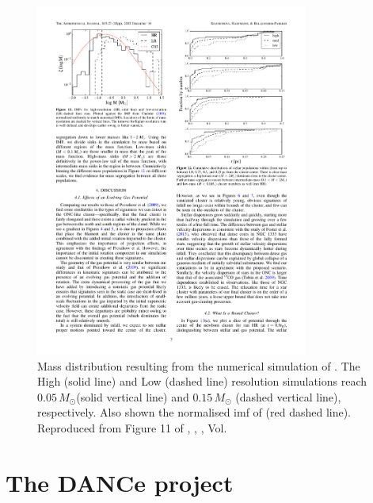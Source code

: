\begin{figure}[ht!]
\begin{center}
\includegraphics[width=0.8\textwidth]{background/Figures/F11_Kuznetsova2015.pdf}
\caption{Mass distribution resulting from the numerical simulation of \citet{2015ApJ...815...27K}. The High (solid line) and Low (dashed line) resolution simulations reach $0.05\, M_{\odot}$(solid vertical line) and $0.15\, M_{\odot}$ (dashed vertical line), respectively. Also shown the normalised \gls{imf} of \citet{Chabrier2005} (red dashed line). Reproduced from Figure 11 of \citet{2015ApJ...815...27K}, \textit{}, , Vol. }
\label{fig:IMFKuznetsova}
\end{center}
\end{figure}

\section{The DANCe project}
\label{sect:DANCeproject}

